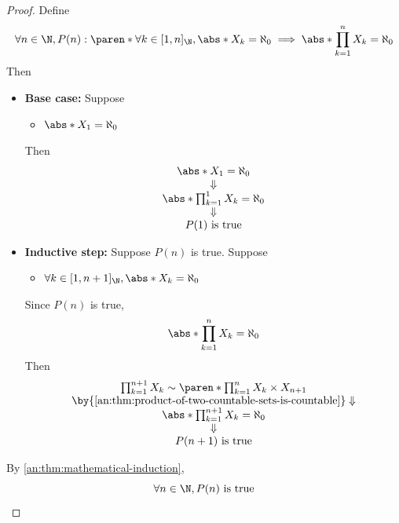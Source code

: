 \begin{proof}
  Define
  \[
    \forall n \in \N, P(n): \paren*{\forall k \in [1, n]_{\N}, \abs*{X_{k}} = \aleph_{0}}
    \implies \abs*{\prod_{k = 1}^{n} X_{k}} = \aleph_{0}
  \]
  Then
  \begin{itemize}
    \item \textbf{Base case:} Suppose
          \begin{itemize}
            \item $\abs*{X_{1}} = \aleph_{0}$
          \end{itemize}
          Then
          \[
            \begin{array}{c}
              \abs*{X_{1}} = \aleph_{0}                   \\
              \Downarrow                                  \\
              \abs*{\prod_{k = 1}^{1} X_{k}} = \aleph_{0} \\
              \Downarrow                                  \\
              P(1) \text{ is true}
            \end{array}
          \]
    \item \textbf{Inductive step:} Suppose $P(n)$ is true. Suppose
          \begin{itemize}
            \item $\forall k \in [1, n + 1]_{\N}, \abs*{X_{k}} = \aleph_{0}$
          \end{itemize}
          Since $P(n)$ is true,
          \[
            \abs*{\prod_{k = 1}^{n} X_{k}} = \aleph_{0}
          \]
          Then
          \[
            \begin{array}{c}
              \prod_{k = 1}^{n + 1} X_{k} \sim \paren*{\prod_{k = 1}^{n} X_{k}} \times X_{n + 1} \\
              \by{\Cref{an:thm:product-of-two-countable-sets-is-countable}} \Downarrow           \\
              \abs*{\prod_{k = 1}^{n + 1} X_{k}} = \aleph_{0}                                    \\
              \Downarrow                                                                         \\
              P(n + 1) \text{ is true}
            \end{array}
          \]
  \end{itemize}
  By \cref{an:thm:mathematical-induction},
  \[
    \forall n \in \N, P(n) \text{ is true}
  \]
\end{proof}

